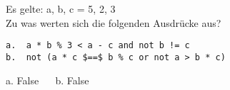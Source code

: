 \question[2]
Es gelte: a, b, c = 5, 2, 3\\
Zu was werten sich die folgenden Ausdrücke aus?
\begin{lstlisting}
a.  a * b % 3 < a - c and not b != c
b.  not (a * c $==$ b % c or not a > b * c)
\end{lstlisting}

\begin{solutionbox}{1cm}
a. False ~~ b. False
\end{solutionbox}
